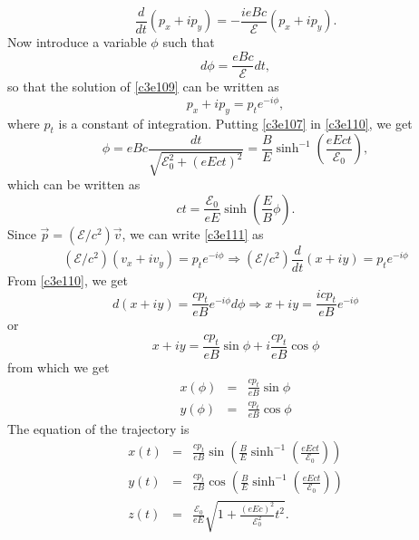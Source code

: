 \begin{enumerate}
\begin{equation}
\frac{d}{dt}(p_x + ip_y) = -\frac{ieBc}{\mathcal{E}}(p_x + ip_y).
\end{equation}
Now introduce a variable $\phi$ such that
\begin{equation}\label{c3e110}
d\phi = \frac{eBc}{\mathcal{E}}dt,
\end{equation}
so that the solution of \eqref{c3e109} can be written as
\begin{equation}\label{c3e111}
p_x + ip_y = p_t e^{-i\phi},
\end{equation}
where $p_t$ is a constant of integration. Putting \eqref{c3e107} in \eqref{c3e110},
we get
\begin{equation}\label{c3e112}
\phi = eBc\frac{dt}{\sqrt{\mathcal{E}_0^2 + (eEct)^2}} = \frac{B}{E}\sinh^{-1}
\left(\frac{eEct}{\mathcal{E}_0}\right),
\end{equation}
which can be written as
\begin{equation}\label{c3e113}
ct = \frac{\mathcal{E}_0}{eE}\sinh\left(\frac{E}{B}\phi\right).
\end{equation}
Since $\vec{p} = (\mathcal{E}/c^2)\vec{v}$, we can write \eqref{c3e111} as
\[
(\mathcal{E}/c^2)(v_x + iv_y) = p_t e^{-i\phi} \Rightarrow 
(\mathcal{E}/c^2)\frac{d}{dt}(x + iy) = p_te^{-i\phi}
\]
From \eqref{c3e110}, we get
\[
d(x + iy) = \frac{cp_t}{eB}e^{-i\phi}d\phi \Rightarrow x + iy = \frac{icp_t}{eB}e^{-i\phi}
\]
or
\[
x + iy = \frac{cp_t}{eB}\sin\phi + i\frac{cp_t}{eB}\cos\phi
\]
from which we get
\begin{eqnarray}
x(\phi) &=& \frac{cp_t}{eB}\sin\phi \label{c3e114} \\
y(\phi) &=& \frac{cp_t}{eB}\cos\phi \label{c3e115}
\end{eqnarray}
The equation of the trajectory is
\begin{eqnarray}
x(t) &=& \frac{cp_t}{eB}\sin\left(\frac{B}{E}\sinh^{-1}\left(\frac{eEct}{\mathcal{E}_0}\right)\right) \label{c3e116} \\
y(t) &=& \frac{cp_t}{eB}\cos\left(\frac{B}{E}\sinh^{-1}\left(\frac{eEct}{\mathcal{E}_0}\right)\right) \label{c3e117} \\
z(t) &=& \frac{\mathcal{E}_0}{eE}\sqrt{1 + \frac{(eEc)^2}{\mathcal{E}_0^2}t^2}. \label{c3e118}
\end{eqnarray}
\end{enumerate}

